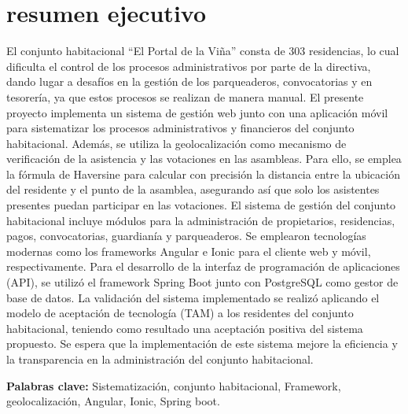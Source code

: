 \chapter*{resumen ejecutivo}

El conjunto habitacional {\textquotedblleft}El Portal de la Viña{\textquotedblright} consta de 303 residencias, lo cual dificulta el control de los procesos administrativos por parte de la directiva, dando lugar a desafíos en la gestión de los parqueaderos, convocatorias y en tesorería, ya que estos procesos se realizan de manera manual.
\bigbreak
El presente proyecto implementa un sistema de gestión web junto con una aplicación móvil para sistematizar los procesos administrativos y financieros del conjunto habitacional. Además, se utiliza la geolocalización como mecanismo de verificación de la asistencia y las votaciones en las asambleas. Para ello, se emplea la fórmula de Haversine para calcular con precisión la distancia entre la ubicación del residente y el punto de la asamblea, asegurando así que solo los asistentes presentes puedan participar en las votaciones.
\bigbreak
El sistema de gestión del conjunto habitacional incluye módulos para la administración de propietarios, residencias, pagos, convocatorias, guardianía y parqueaderos. Se emplearon tecnologías modernas como los frameworks Angular e Ionic para el cliente web y móvil, respectivamente. Para el desarrollo de la interfaz de programación de aplicaciones (API), se utilizó el framework Spring Boot junto con PostgreSQL como gestor de base de datos.
\bigbreak
La validación del sistema implementado se realizó aplicando el modelo de aceptación de tecnología (TAM) a los residentes del conjunto habitacional, teniendo como resultado una aceptación positiva del sistema propuesto. Se espera que la implementación de este sistema mejore la eficiencia y la transparencia en la administración del conjunto habitacional.

\vfill
\textbf{Palabras clave:} Sistematización, conjunto habitacional, Framework, geolocalización, Angular, Ionic, Spring boot.
